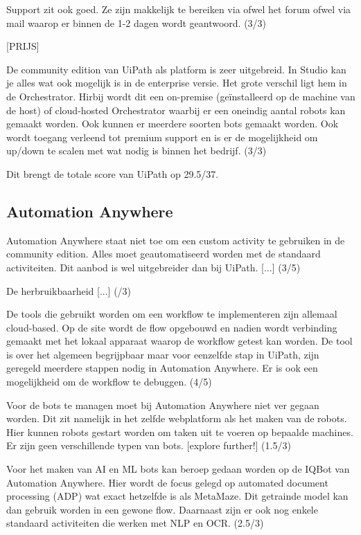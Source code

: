 Support zit ook goed. Ze zijn makkelijk te bereiken via ofwel het forum ofwel via mail waarop er binnen de 1-2 dagen wordt geantwoord. (3/3)

[PRIJS]

De community edition van UiPath als platform is zeer uitgebreid. In Studio kan je alles wat ook mogelijk is in de enterprise versie. Het grote verschil ligt hem in de Orchestrator. Hirbij wordt dit een on-premise (geïnstalleerd op de machine van de host) of cloud-hosted Orchestrator waarbij er een oneindig aantal robots kan gemaakt worden. Ook kunnen er meerdere soorten bots gemaakt worden. Ook wordt toegang verleend tot premium support en is er de mogelijkheid om up/down te scalen met wat nodig is binnen het bedrijf. (3/3)

Dit brengt de totale score van UiPath op 29.5/37.

\subsection{Automation Anywhere}
Automation Anywhere staat niet toe om een custom activity te gebruiken in de community edition. Alles moet geautomatiseerd worden met de standaard activiteiten. Dit aanbod is wel uitgebreider dan bij UiPath. [...] (3/5)

De herbruikbaarheid [...] (/3)

De tools die gebruikt worden om een workflow te implementeren zijn allemaal cloud-based. Op de site wordt de flow opgebouwd en nadien wordt verbinding gemaakt met het lokaal apparaat waarop de workflow getest kan worden. De tool is over het algemeen begrijpbaar maar voor eenzelfde stap in UiPath, zijn geregeld meerdere stappen nodig in Automation Anywhere. Er is ook een mogelijkheid om de workflow te debuggen. (4/5)

Voor de bots te managen moet bij Automation Anywhere niet ver gegaan worden. Dit zit namelijk in het zelfde webplatform als het maken van de robots. Hier kunnen robots gestart worden om taken uit te voeren op bepaalde machines. Er zijn geen verschillende typen van bots. [explore further!] (1.5/3)

Voor het maken van AI en ML bots kan beroep gedaan worden op de IQBot van Automation Anywhere. Hier wordt de focus gelegd op automated document processing (ADP) wat exact hetzelfde is als MetaMaze. Dit getrainde model kan dan gebruik worden in een gewone flow. Daarnaast zijn er ook nog enkele standaard activiteiten die werken met NLP en OCR. (2.5/3)

